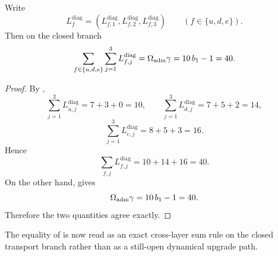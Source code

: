 \begin{corollary}
\label{cor:transport-length-sum-rule}
Write
\[
L_f^{\mathrm{diag}}=(L_{f,1}^{\mathrm{diag}},L_{f,2}^{\mathrm{diag}},L_{f,3}^{\mathrm{diag}})
\qquad
(f\in\{u,d,e\}).
\]
Then on the closed branch
\[
\sum_{f\in\{u,d,e\}}\sum_{j=1}^{3}L_{f,j}^{\mathrm{diag}}
=
\Omega_{\mathrm{adm}}\gamma
=
10\,b_1-1
=
40.
\]
\end{corollary}

\begin{proof}
By ,
\[
\sum_{j=1}^3L_{u,j}^{\mathrm{diag}}=7+3+0=10,
\qquad
\sum_{j=1}^3L_{d,j}^{\mathrm{diag}}=7+5+2=14,
\]
\[
\sum_{j=1}^3L_{e,j}^{\mathrm{diag}}=8+5+3=16.
\]
Hence
\[
\sum_{f,j}L_{f,j}^{\mathrm{diag}}=10+14+16=40.
\]
On the other hand,  gives
\[
\Omega_{\mathrm{adm}}\gamma=10\,b_1-1=40.
\]
Therefore the two quantities agree exactly.
\end{proof}

\begin{remark}
The equality of  is now read as an exact cross-layer sum
rule on the closed transport branch rather than as a still-open dynamical upgrade path.
\end{remark}
